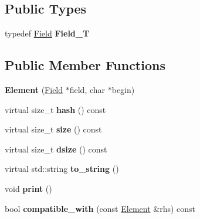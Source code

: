 \subsection*{Public Types}
\begin{DoxyCompactItemize}
\item 
typedef \hyperlink{classField}{Field} {\bfseries Field\+\_\+T}\hypertarget{classElement_af63af4ed8d72a9bf3abfe86e4cd2e074}{}\label{classElement_af63af4ed8d72a9bf3abfe86e4cd2e074}

\end{DoxyCompactItemize}
\subsection*{Public Member Functions}
\begin{DoxyCompactItemize}
\item 
{\bfseries Element} (\hyperlink{classField}{Field} $\ast$field, char $\ast$begin)\hypertarget{classElement_aed61f8f2a95c9a25046d24a7ed936c3a}{}\label{classElement_aed61f8f2a95c9a25046d24a7ed936c3a}

\item 
virtual size\+\_\+t {\bfseries hash} () const \hypertarget{classElement_a8f46e86dbbd8c7f18c3135742863f3d2}{}\label{classElement_a8f46e86dbbd8c7f18c3135742863f3d2}

\item 
virtual size\+\_\+t {\bfseries size} () const \hypertarget{classElement_a2b8bc248847a45f69cb93965f2a43fa2}{}\label{classElement_a2b8bc248847a45f69cb93965f2a43fa2}

\item 
virtual size\+\_\+t {\bfseries dsize} () const \hypertarget{classElement_a4ce1ba3e934357bd5b9e1bd417641b60}{}\label{classElement_a4ce1ba3e934357bd5b9e1bd417641b60}

\item 
virtual std\+::string {\bfseries to\+\_\+string} ()\hypertarget{classElement_aa9d6b55e58ea084033fb6a96878818da}{}\label{classElement_aa9d6b55e58ea084033fb6a96878818da}

\item 
void {\bfseries print} ()\hypertarget{classElement_a6301e3975df2893421cf3c2dfd64aacb}{}\label{classElement_a6301e3975df2893421cf3c2dfd64aacb}

\item 
bool {\bfseries compatible\+\_\+with} (const \hyperlink{classElement}{Element} \&rhs) const \hypertarget{classElement_ad6dc36d4e46416a511e7ec9d25591f28}{}\label{classElement_ad6dc36d4e46416a511e7ec9d25591f28}


\end{DoxyCompactItemize}
